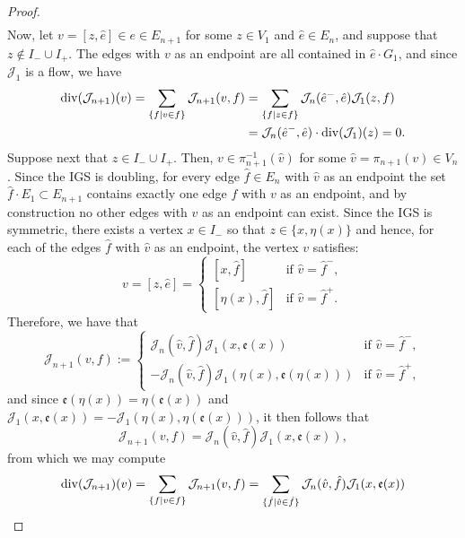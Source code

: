\documentclass{amsart}
\newcommand{\divr}{{\rm div}}
\numberwithin{equation}{section}
\theoremstyle{definition}
\theoremstyle{remark}
\newcommand{\cJ}{\mathcal{J}}
\begin{document}
\begin{proof}
\[\begin{split}
        \end{split}
        \]
    Now, let \(v=[z,\hat{e}]\in e\in E_{n+1}\) for some \(z\in V_1\) and \(\hat{e}\in E_n\), and suppose that \(z\not\in I_-\cup I_+\). The edges with \(v\) as an endpoint are all contained in \(\hat{e}\cdot G_1\), and since \(\cJ_1\) is a flow, we have
        \[
        \begin{split}
            \divr(\cJ_{n+1})(v)=\sum_{\{f\mid v\in f\}}\cJ_{n+1}(v,f)&=\sum_{\{f\mid z\in f\}}\cJ_n(\hat{e}^-,\hat{e})\cJ_1(z,f)\\
            &=\cJ_n(\hat{e}^-,\hat{e})\cdot\divr(\cJ_1)(z) =0.
        \end{split}
        \]
    Suppose next that \(z\in I_-\cup I_+\). Then, \(v\in\pi_{n+1}^{-1}(\hat{v})\) for some \(\hat{v}=\pi_{n+1}(v)\in V_n\). Since the IGS is doubling, for every edge \(\hat{f}\in E_n\) with \(\hat{v}\) as an endpoint the set \(\hat{f}\cdot E_1\subset E_{n+1}\) contains exactly one edge \(f\) with \(v\) as an endpoint, and by construction no other edges with \(v\) as an endpoint can exist. Since the IGS is symmetric, there exists a vertex \(x\in I_-\) so that \(z\in\{x,\eta(x)\}\) and hence, for each of the edges \(\hat{f}\) with \(\hat{v}\) as an endpoint, the vertex \(v\) satisfies:
    \[
        v=[z,\hat{e}]=
        \begin{cases}
            [x,\hat{f}]&\text{if }\hat{v}=\hat{f}^-,\\
            [\eta(x),\hat{f}]&\text{if }\hat{v}=\hat{f}^+.
        \end{cases}
    \]
    Therefore, we have that
    \[
        \cJ_{n+1}(v,f):=
        \begin{cases}
            \cJ_n(\hat{v},\hat{f})\cJ_1(x,\mathfrak{e}(x))  &\text{if }\hat{v}=\hat{f}^-,\\
            -\cJ_n(\hat{v},\hat{f})\cJ_1(\eta(x),\mathfrak{e}(\eta(x))) &\text{if }\hat{v}=\hat{f}^+,
        \end{cases}
    \]
    and since \(\mathfrak{e}(\eta(x))=\eta(\mathfrak{e}(x))\) and \(\cJ_1(x,\mathfrak{e}(x))=-\cJ_1(\eta(x),\eta(\mathfrak{e}(x)))\), it then follows that
    \[
        \cJ_{n+1}(v,f)=\cJ_n(\hat{v},\hat{f})\cJ_1(x,\mathfrak{e}(x)),
    \]
    from which we may compute
    \begin{equation}\label{Equation: Divergence Lift}
    \begin{split}
        \divr(\cJ_{n+1})(v)=\sum_{\{f\mid v\in f\}}\cJ_{n+1}(v,f)&=\sum_{\{\hat{f}\mid \hat{v}\in\hat{f}\}}\cJ_n(\hat{v},\hat{f}) \cJ_1(x,\mathfrak{e}(x))\\

\end{split}
\end{equation}
\end{proof}
\end{document}
